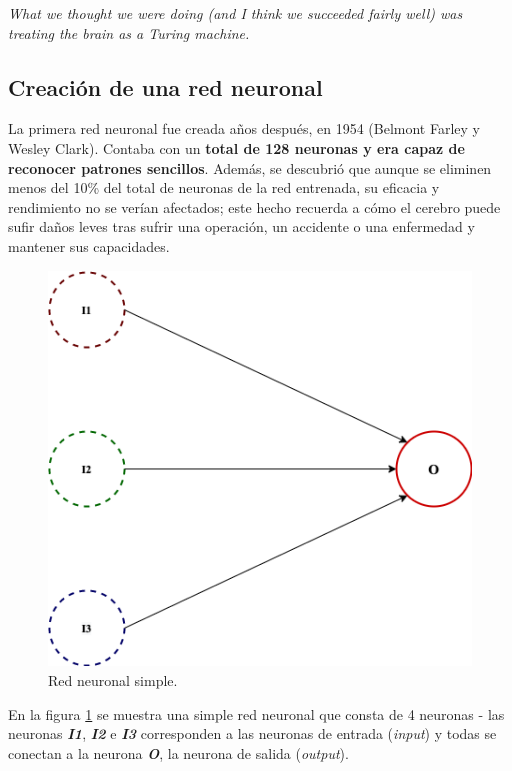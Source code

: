 \begin{displayquote}\textit{
What we thought we were doing (and I think we succeeded fairly well) was treating the brain as a Turing machine.}
\end{displayquote}

\subsection{Creación de una red neuronal}

La primera red neuronal fue creada años después, en 1954 (Belmont Farley y Wesley Clark). Contaba con un \textbf{total de 128 neuronas y era capaz de reconocer patrones sencillos}. Además, se descubrió que aunque se eliminen menos del 10\% del total de neuronas de la red entrenada, su eficacia y rendimiento no se verían afectados; este hecho recuerda a cómo el cerebro puede sufir daños leves tras sufrir una operación, un accidente o una enfermedad y mantener sus capacidades. \\

\begin{figure}[h]
    \centering
    \includegraphics[scale=0.35]{cap2_contextualizacion/images/red_neuronal.png}
    \caption{Red neuronal simple.}
    \label{fig:red_neuronal_simple}
\end{figure}

En la figura \ref{fig:red_neuronal_simple} se muestra una simple red neuronal que consta de 4 neuronas - las neuronas \textbf{\textit{I1}}, \textbf{\textit{I2}} e \textbf{\textit{I3}} corresponden a las neuronas de entrada (\textit{input}) y todas se conectan a la neurona \textbf{\textit{O}}, la neurona de salida (\textit{output}). \\

